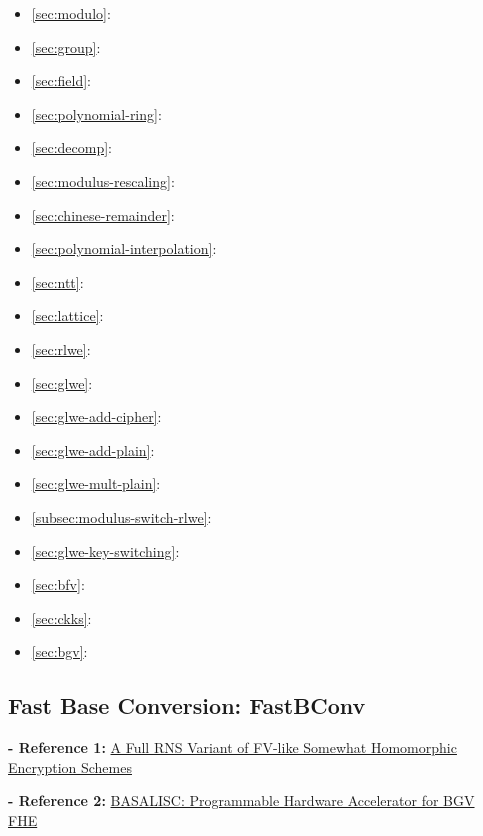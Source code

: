 \begin{itemize}
\item \autoref{sec:modulo}: 
\item \autoref{sec:group}: 
\item \autoref{sec:field}: 
\item \autoref{sec:polynomial-ring}: 
\item \autoref{sec:decomp}: 
\item \autoref{sec:modulus-rescaling}: 
\item \autoref{sec:chinese-remainder}: 
\item \autoref{sec:polynomial-interpolation}: 
\item \autoref{sec:ntt}: 
\item \autoref{sec:lattice}: 
\item \autoref{sec:rlwe}: 
\item \autoref{sec:glwe}: 
\item \autoref{sec:glwe-add-cipher}: 
\item \autoref{sec:glwe-add-plain}: 
\item \autoref{sec:glwe-mult-plain}: 
\item \autoref{subsec:modulus-switch-rlwe}: 
\item \autoref{sec:glwe-key-switching}: 
\item \autoref{sec:bfv}: 
\item \autoref{sec:ckks}: 
\item \autoref{sec:bgv}: 
\end{itemize}

\subsection{Fast Base Conversion: \textsf{FastBConv}}
\label{subsec:rns-fastbconv}

\noindent \textbf{- Reference 1:} 
\href{https://eprint.iacr.org/2016/510}{A Full RNS Variant of FV-like Somewhat Homomorphic Encryption Schemes}~\cite{rns-bfv}

\noindent \textbf{- Reference 2:} 
\href{https://eprint.iacr.org/2022/657}{BASALISC: Programmable Hardware Accelerator for BGV FHE}~\cite{rns-bfv2}

